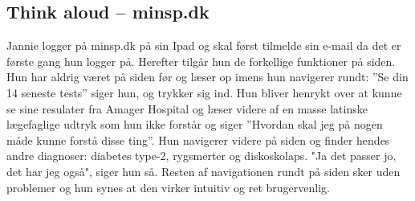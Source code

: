 \documentclass[english]{article}
\begin{document}
\subsection*{Think aloud – minsp.dk}
Jannie logger på minsp.dk på sin Ipad og skal først tilmelde sin e-mail da det er første gang hun logger på. Herefter tilgår hun de forkellige funktioner på siden. Hun har aldrig været på siden før og  læser op imens hun navigerer rundt: ”Se din 14 seneste tests” siger hun, og trykker sig ind. Hun bliver henrykt over at kunne se sine resulater fra Amager Hospital og læser videre af en masse latinske lægefaglige udtryk som hun ikke forstår og siger ”Hvordan skal jeg på nogen måde kunne forstå disse ting”. Hun navigerer videre på siden og finder hendes andre diagnoser: diabetes type-2, rygsmerter og diskoskolaps. "Ja det passer jo, det har jeg også", siger hun så. Resten af navigationen rundt på siden sker uden problemer og hun synes at den virker intuitiv og ret brugervenlig. 
\end{document}

